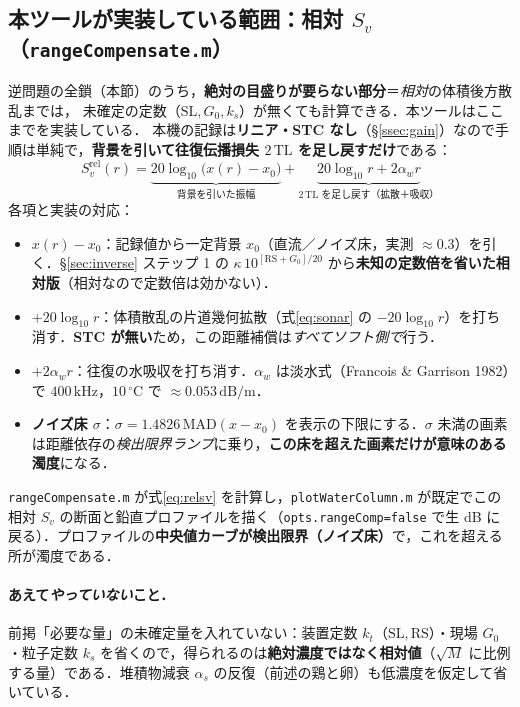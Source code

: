 \documentclass[11pt]{ltjsarticle}
\newcommand{\unit}[1]{\,\mathrm{#1}}
\begin{document}
\subsection{本ツールが実装している範囲：相対 $S_v$（\texttt{rangeCompensate.m}）}
\label{ssec:impl}
逆問題の全鎖（本節）のうち，\textbf{絶対の目盛りが要らない部分}＝\emph{相対}の体積後方散乱までは，
未確定の定数（$\mathrm{SL},G_0,k_s$）が無くても計算できる．本ツールはここまでを実装している．
本機の記録は\textbf{リニア・STC なし}（\S\ref{ssec:gain}）なので手順は単純で，\textbf{背景を引いて往復伝播損失 $2\,\mathrm{TL}$ を足し戻すだけ}である：
\begin{equation}
\boxed{\;S_v^{\mathrm{rel}}(r)=\underbrace{20\log_{10}\!\big(x(r)-x_0\big)}_{\text{背景を引いた振幅}}
+\underbrace{20\log_{10} r+2\alpha_w r}_{\text{$2\,\mathrm{TL}$ を足し戻す（拡散＋吸収）}}\;}
\label{eq:relsv}
\end{equation}
各項と実装の対応：
\begin{itemize}[nosep]
  \item $x(r)-x_0$：記録値から一定背景 $x_0$（直流／ノイズ床，実測 $\approx0.3$）を引く．\S\ref{sec:inverse} ステップ 1 の $\kappa\,10^{[\mathrm{RS}+G_0]/20}$ から\textbf{未知の定数倍を省いた相対版}（相対なので定数倍は効かない）．
  \item $+20\log_{10}r$：体積散乱の片道幾何拡散（式\eqref{eq:sonar} の $-20\log_{10}r$）を打ち消す．\textbf{STC が無い}ため，この距離補償は\emph{すべてソフト側で}行う．
  \item $+2\alpha_w r$：往復の水吸収を打ち消す．$\alpha_w$ は淡水式（Francois \& Garrison 1982）で $400\unit{kHz}$，$10\,^\circ\mathrm{C}$ で $\approx0.053\unit{dB/m}$．
  \item \textbf{ノイズ床 $\sigma$}：$\sigma=1.4826\,\mathrm{MAD}(x-x_0)$ を表示の下限にする．$\sigma$ 未満の画素は距離依存の\emph{検出限界ランプ}に乗り，\textbf{この床を超えた画素だけが意味のある濁度}になる．
\end{itemize}
\texttt{rangeCompensate.m} が式\eqref{eq:relsv} を計算し，\texttt{plotWaterColumn.m} が既定でこの相対 $S_v$ の断面と鉛直プロファイルを描く（\texttt{opts.rangeComp=false} で生 dB に戻る）．プロファイルの\textbf{中央値カーブが検出限界（ノイズ床）}で，これを超える所が濁度である．

\paragraph{あえて\emph{やっていない}こと．}
前掲「必要な量」の未確定量を入れていない：装置定数 $k_t$（$\mathrm{SL},\mathrm{RS}$）・現場 $G_0$・粒子定数 $k_s$ を省くので，得られるのは\textbf{絶対濃度ではなく相対値}（$\sqrt{M}$ に比例する量）である．堆積物減衰 $\alpha_s$ の反復（前述の鶏と卵）も低濃度を仮定して省いている．
\end{document}
